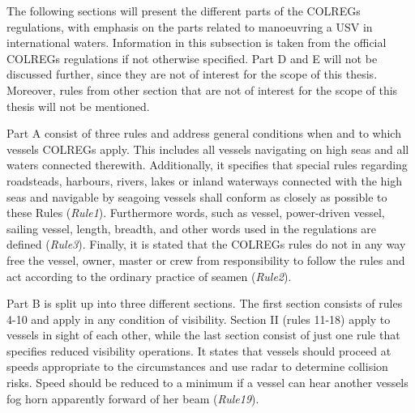 The following sections will present the different parts of the COLREGs regulations, with emphasis on the parts related to manoeuvring a USV in international waters. Information in this subsection is taken from the official COLREGs regulations  \cite{colreg} if not otherwise specified. Part D and E will not be discussed further, since they are not of interest for the scope of this thesis. Moreover, rules from other section that are not of interest for the scope of this thesis will not be mentioned.

Part A consist of three rules and address general conditions when and to which vessels COLREGs apply. This includes all vessels navigating on high seas and all waters connected therewith. Additionally, it specifies that special rules regarding roadsteads, harbours, rivers, lakes or inland waterways connected with the high seas and navigable by seagoing vessels shall conform as closely as possible to these Rules (\textit{Rule1}). Furthermore words, such as vessel, power-driven vessel, sailing vessel, length, breadth, and other words used in the regulations are defined (\textit{Rule3}). Finally, it is stated that the COLREGs rules do not in any way free the vessel, owner, master or crew from responsibility to follow the rules and act according to the ordinary practice of seamen (\textit{Rule2}).

Part B is split up into three different sections. The first section consists of rules 4-10 and apply in any condition of visibility. Section II (rules 11-18) apply to vessels in sight of each other, while the last section consist of just one rule that specifies reduced visibility operations. It states that vessels should proceed at speeds appropriate to the circumstances and use radar to determine collision risks. Speed should be reduced to a minimum if a vessel can hear another vessels fog horn apparently forward of her beam (\textit{Rule19}).

